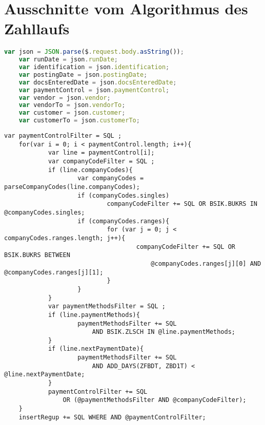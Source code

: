 \clearpage
\section{Ausschnitte vom Algorithmus des Zahllaufs}

\begin{lstlisting}[caption={Ermittlung der Nutzereingaben aus der JSON-Anfrage}, label={lst:jsoninput}, language=JavaScript, basicstyle=\ttfamily\scriptsize]
    var json = JSON.parse($.request.body.asString());
    var runDate = json.runDate;
    var identification = json.identification;
    var postingDate = json.postingDate;
    var docsEnteredDate = json.docsEnteredDate;
    var paymentControl = json.paymentControl;
    var vendor = json.vendor;
    var vendorTo = json.vendorTo;
    var customer = json.customer;
    var customerTo = json.customerTo;
\end{lstlisting}

\begin{lstlisting}[caption={Verarbeitung der Filter in Tabellenform}, label={lst:paymentcontrol}, language=JavaScriptSQL, basicstyle=\ttfamily\scriptsize]
	var paymentControlFilter = SQL ;
	for(var i = 0; i < paymentControl.length; i++){
			var line = paymentControl[i];
			var companyCodeFilter = SQL ;
			if (line.companyCodes){
					var companyCodes = parseCompanyCodes(line.companyCodes);
					if (companyCodes.singles)
							companyCodeFilter += SQL OR BSIK.BUKRS IN @companyCodes.singles;
					if (companyCodes.ranges){
							for (var j = 0; j < companyCodes.ranges.length; j++){
									companyCodeFilter += SQL OR BSIK.BUKRS BETWEEN
										@companyCodes.ranges[j][0] AND @companyCodes.ranges[j][1];
							}
					}
			}
			var paymentMethodsFilter = SQL ;
			if (line.paymentMethods){
					paymentMethodsFilter += SQL
						AND BSIK.ZLSCH IN @line.paymentMethods;
			}
			if (line.nextPaymentDate){
					paymentMethodsFilter += SQL
						AND ADD_DAYS(ZFBDT, ZBD1T) < @line.nextPaymentDate;
			}
			paymentControlFilter += SQL
				OR (@paymentMethodsFilter AND @companyCodeFilter);
	}
	insertRegup += SQL WHERE AND @paymentControlFilter;
\end{lstlisting}

